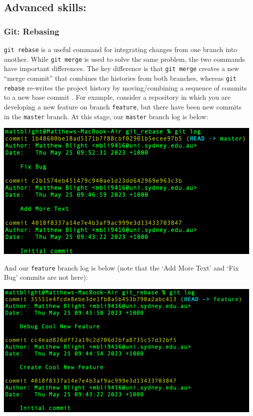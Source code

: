 \documentclass[a4paper, 11pt]{report}
\begin{document}
\subsection{Advanced skills: \studA}

\subsubsection{Git: Rebasing}

\verb|git rebase| is a useful command for integrating changes from one branch into another. While \verb|git merge| is used to solve the same problem, the two commands have important differences. The key difference is that \verb|git merge| creates a new “merge commit” that combines the histories from both branches, whereas \verb|git rebase| re-writes the project history by moving/combining a sequence of commits to a new base commit \cite{mergingvrebasing}. For example, consider a repository in which you are developing a new feature on branch \verb|feature|, but there have been new commits in the \verb|master| branch. At this stage, our \verb|master| branch log is below:

\includegraphics[width=\textwidth]{rebase1}

And our \verb|feature| branch log is below (note that the ‘Add More Text’ and ‘Fix Bug’ commits are not here):

\includegraphics[width=\textwidth]{rebase2}
\end{document}
